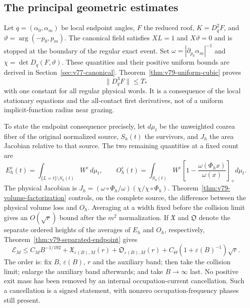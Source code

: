 \documentclass[11pt,reqno]{amsart}
\numberwithin{equation}{section}
\theoremstyle{definition}
\theoremstyle{remark}\newtheorem{remark}[theorem]{Remark}
\begin{document}
\subsection{The principal geometric estimates}
Let $q=(\alpha_0,\alpha_m)$ be local endpoint angles, $F$ the reduced
roof, $K=D_q^2F$, and $\vartheta=\arg(-p_0,p_m)$. The canonical field
satisfies $XL=1$ and $X\vartheta=0$ and is stopped at the boundary of
the regular exact event. Set $\omega=|\partial_{p_0}\alpha_m|^{-1}$ and
$\chi=\det D_q(F,\vartheta)$. These quantities and their positive
uniform bounds are derived in Section~\ref{sec:v77-canonical}.
Theorem~\ref{thm:v79-uniform-cubic} proves
\[
                         \|D_q^3F\|\le T_*
\]
with one constant for all regular physical words. It is a consequence
of the local stationary equations and the all-contact first derivatives,
not of a uniform implicit-function radius near grazing.

To state the endpoint consequence precisely, let $d\mu_t$ be the
unweighted coarea fiber of the original normalized source, $S_h(t)$
the survivors, and $J_h$ the area Jacobian relative to that source.
The two remaining quantities at a fixed count are
\[
 E_h^\varepsilon(t)=\int_{\{L=t\}\setminus S_h(t)}W^\varepsilon\,d\mu_t,
 \qquad
 O_h^\varepsilon(t)=\int_{S_h(t)}W^\varepsilon
                 \left[1-\frac{\omega(\Phi_hx)}{\omega(x)}\right]_+d\mu_t.
\]
The physical Jacobian is
$J_h=(\omega\circ\Phi_h/\omega)(\chi/\chi\circ\Phi_h)$.
Theorem~\ref{thm:v79-volume-factorization} controls, on the complete
source, the difference between the physical volume loss and $O_h$.
Averaging at a width fixed before the collision limit gives an
$O(\sqrt r)$ bound after the $m^2$ normalization. If $\mathfrak X$ and
$\mathfrak O$ denote the separate ordered heights of the averages of
$E_h$ and $O_h$, respectively, Theorem~\ref{thm:v79-separated-endpoint}
gives
\[
 \mathcal E_M\le C_MB^{-1/192}
       +\mathfrak X_{\varepsilon(B),M}(r)
       +\mathfrak O_{\varepsilon(B),M}(r)
       +C_\Theta(1+\varepsilon(B)^{-1})\sqrt r.
\]
The order is: fix $B$, $\varepsilon(B)$, $r$ and the auxiliary band;
then take the collision limit; enlarge the auxiliary band afterwards;
and take $B\to\infty$ last. No positive exit mass has been removed by
an internal occupation-current cancellation. Such a cancellation is a
signed statement, with nonzero occupation-frequency phases still present.
\end{document}
